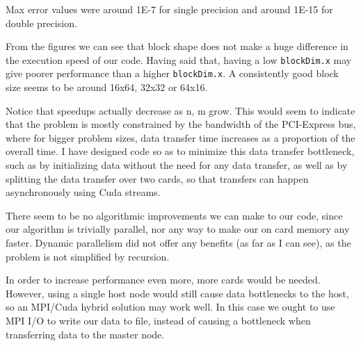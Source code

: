 \documentclass[a4paper, fleqn]{article}
\begin{document}
Max error values were around 1E-7 for single precision and around 1E-15 for double precision.

From the figures we can see that block shape does not make a huge difference in the execution speed of our code. Having said that, having a low \texttt{blockDim.x} may give poorer performance than a higher \texttt{blockDim.x}. A consistently good block size seems to be around 16x64, 32x32 or 64x16. 

Notice that speedups actually decrease as n, m grow. This would seem to indicate that the problem is mostly constrained by the bandwidth of the PCI-Express bus, where for bigger problem sizes, data transfer time increases as a proportion of the overall time. I have designed code so as to minimize this data transfer bottleneck, such as by initializing data without the need for any data transfer, as well as by splitting the data transfer over two cards, so that transfers can happen asynchronously using Cuda streams.

There seem to be no algorithmic improvements we can make to our code, since our algorithm is trivially parallel, nor any way to make our on card memory any faster. Dynamic parallelism did not offer any benefits (as far as I can see), as the problem is not simplified by recursion.

In order to increase performance even more, more cards would be needed. However, using a single host node would still cause data bottlenecks to the host, so an MPI/Cuda hybrid solution may work well. In this case we ought to use MPI I/O to write our data to file, instead of causing a bottleneck when transferring data to the master node. 
\end{document}
